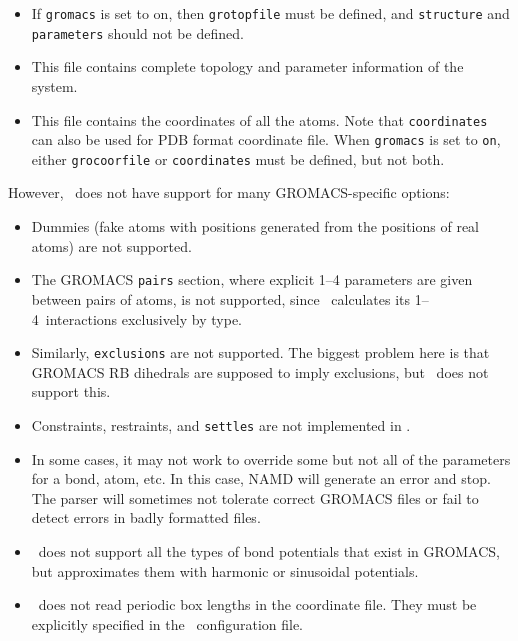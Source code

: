 \begin{itemize}
\item
{}
{
If {\tt gromacs} is set to on, then {\tt grotopfile} must be defined,
and {\tt structure} and {\tt parameters} should not be defined.
}
\item
{}
{
This file contains complete topology and parameter information of
the system.
}

\item
{}
{
This file contains the coordinates of all the atoms. Note that
{\tt coordinates} can also be used for PDB format coordinate
file. When {\tt gromacs} is set to {\tt on}, either {\tt grocoorfile}
or {\tt coordinates} must be defined, but not both.
}
\end{itemize}

\noindent However, \NAMD\ does not have support for many GROMACS-specific
options:

\begin{itemize}

\item Dummies (fake atoms with positions generated from the positions
of real atoms) are not supported.
\item The GROMACS \verb^pairs^ section, where explicit 1--4 parameters
are given between pairs of atoms, is not supported, since \NAMD\
calculates its 1--4~interactions exclusively by type.
\item Similarly, \verb^exclusions^ are not supported.  The biggest
problem here is that GROMACS RB dihedrals are supposed to imply
exclusions, but \NAMD\ does not support this.
\item Constraints, restraints, and \verb^settles^ are not
implemented in \NAMD.
\item In some cases, it may not work to override some but not all of
the parameters for a bond, atom, etc.  In this case, NAMD will
generate an error and stop.  The parser will sometimes not tolerate
correct GROMACS files or fail to detect errors in badly formatted
files.
\item \NAMD\ does not support all the types of bond potentials that
exist in GROMACS, but approximates them with harmonic or sinusoidal
potentials.
\item \NAMD\ does not read periodic box lengths in the
coordinate file. They must be explicitly specified in the \NAMD\
configuration file.

\end{itemize}

